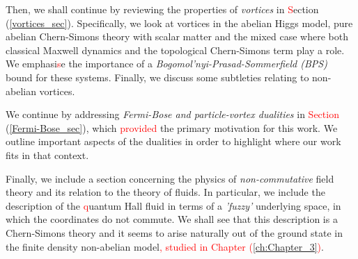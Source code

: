     Then, we shall continue by reviewing the properties of \textit{vortices} in \textcolor{red}{S}ection (\ref{vortices_sec}). Specifically, we look at vortices in the abelian Higgs model, pure abelian Chern-Simons theory with scalar matter and the mixed case where both classical Maxwell dynamics and the topological Chern-Simons term play a role. We emphasi\textcolor{red}{s}e the importance of a \textit{Bogomol'nyi-Prasad-Sommerfield (BPS)} \cite{Bogomolny:1975de, Prasad:1975kr} bound for these systems. Finally, we discuss some subtleties relating to non-abelian vortices.

    We continue by addressing \textit{Fermi-Bose and particle-vortex dualities} in \textcolor{red}{Section} (\ref{Fermi-Bose_sec}), which \textcolor{red}{provided} the primary motivation for this work. \colorbox{red}{ }  We outline important aspects of the dualities in order to highlight where our work fits in that context.

    Finally, we include a section concerning the physics of \textit{non-commutative} field theory and its relation to the theory of fluids. In particular, we include the description of the \textcolor{red}{q}uantum Hall fluid in terms of a \textit{'fuzzy'} underlying space, in which the coordinates do not commute. We shall see that this description is a Chern-Simons theory and it seems to arise naturally out of the ground state in the finite density non-abelian model\textcolor{red}{, studied in Chapter \textcolor{red}{(\ref{ch:Chapter_3})}}.

